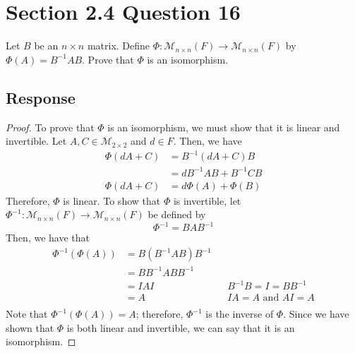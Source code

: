 \documentclass[13pt]{article}
\begin{document}
        \newpage
        \section*{Section 2.4 Question 16}
        Let $B$ be an $n \times n$ matrix. Define $\Phi : \mathcal{M}_{n \times n}(F) \rightarrow \mathcal{M}_{n \times n}(F)$ by $\Phi(A) = B^{-1}AB$. Prove that $\Phi$ is an isomorphism.
        \subsection*{Response}
        \begin{proof}
          To prove that $\Phi$ is an isomorphism, we must show that it is linear and invertible. Let $A, C \in \mathcal{M}_{2 \times 2}$ and $d \in F$. Then, we have
          \begin{align*}
            \Phi(dA + C) &= B^{-1}(dA + C)B \\
                         &= dB^{-1}AB + B^{-1}CB \\
            \Phi(dA + C) &= d\Phi(A) + \Phi(B)
          \end{align*}
          Therefore, $\Phi$ is linear. To show that $\Phi$ is invertible, let $\Phi^{-1} : \mathcal{M}_{n \times n}(F) \rightarrow \mathcal{M}_{n \times n}(F)$ be defined by
          \[\Phi^{-1} = BAB^{-1}\]
          Then, we have that
          \begin{align*}
            \Phi^{-1}(\Phi(A)) &= B(B^{-1}AB)B^{-1} \\
                               &= BB^{-1}ABB^{-1} \\
                               &= IAI && B^{-1}B = I = BB^{-1}\\
                               &= A && IA = A \text{ and } AI = A \\
          \end{align*}
          Note that $\Phi^{-1}(\Phi(A)) = A$; therefore, $\Phi^{-1}$ is the inverse of $\Phi$. Since we have shown that $\Phi$ is both linear and invertible, we can say that it is an isomorphism.
        \end{proof}

        \newpage
\end{document}
